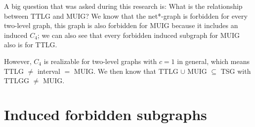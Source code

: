 A big question that was asked during this research is: What is the relationship between TTLG and MUIG? We know that the net*-graph is forbidden for every two-level graph, this graph is also forbidden for MUIG because it includes an induced $C_4$; we can also see that every forbidden induced subgraph for MUIG also is for TTLG.

However, $C_4$ is realizable for two-level graphs with $c = 1$ in general, which means TTLG $\neq$ interval $=$ MUIG. We then know that TTLG $\cup$ MUIG $\subseteq$ TSG with TTLGG $\neq$ MUIG.


\section{Induced forbidden subgraphs}

